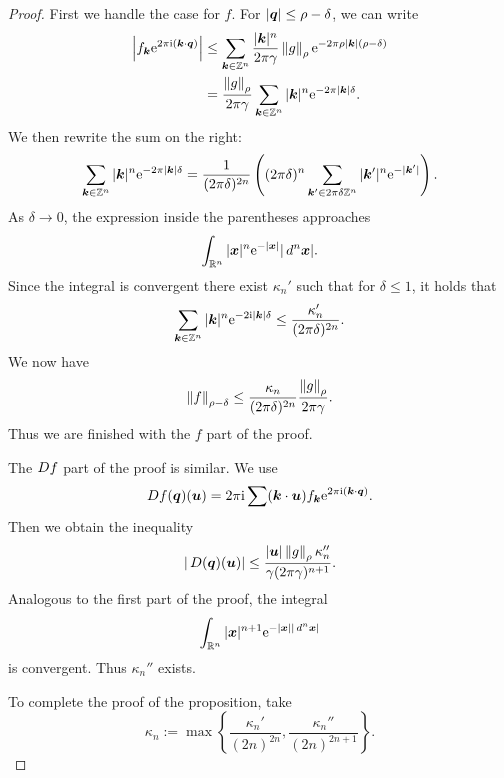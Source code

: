 \documentclass[twoside,letterpaper,11pt]{article}
\numberwithin{equation}{section}
\begin{document}
\begin{proof}
  First we handle the case for $f$.
  For $|\bm{q}| \leq \rho - \delta$, we can write
  \begin{align*}
    \left| f_{\bp{k}} \e^{2 \pi \i (\bp{k} \cdot \bp{q})} \right|
    &\leq \sum_{\bp{k} \in \Z^n} \frac{|\bp{k}|^n}{2\pi\gamma} \norm{g}_{\rho}
      \e^{-2 \pi \rho |\bp{k}|(\rho - \delta)}\\
    &= \frac{\norm{g}_{\rho}}{2 \pi \gamma} \sum_{\bp{k} \in \Z^n} |\bp{k}|^n
      \e^{-2 \pi |\bp{k}|\delta}.
  \end{align*}
  We then rewrite the sum on the right:
  \begin{equation*}
    \sum_{\bm{k} \in \mathbb{Z}^n} |\bm{k}|^n \mathrm{e}^{-2 \pi |\bm{k}|\delta} = \frac{1}{(2
      \pi \delta)^{2n}} \left((2 \pi \delta)^n \sum_{\bm{k}' \in 2 \pi \delta
        \mathbb{Z}^n} |\bm{k}'|^n \mathrm{e}^{-|\bm{k}'|} \right).
  \end{equation*}
  As $\delta \to 0$, the expression inside the parentheses approaches
  \begin{equation*}
    \int_{\mathbb{R}^n} |\bm{x}|^n \mathrm{e}^{-|\bm{x}|} |\mathop{}\!d^n \bm{x}|.
  \end{equation*}
  Since the integral is convergent there exist $\kappa_n'$ such that for $\delta
  \leq 1$, it holds that
  \begin{equation*}
    \sum_{\bm{k} \in \mathbb{Z}^n} |\bm{k}|^n \mathrm{e}^{-2 \mathrm{i} |\bm{k}|\delta} \leq
    \frac{\kappa_n'}{(2 \pi \delta)^{2n}}.
  \end{equation*}
  We now have
  \begin{equation*}
    \norm{f}_{\rho - \delta} \leq \frac{\kappa_n}{(2 \pi \delta)^{2n}}
    \frac{\norm{g}_{\rho}}{2 \pi \gamma}.
  \end{equation*}
  Thus we are finished with the $f$ part of the proof.

  The $\mathop{}\!D f$ part of the proof is similar.
  We use
  \begin{equation*}
    \mathop{}\!D f(\bm{q})(\bm{u}) = 2 \pi \mathrm{i} \sum(\bm{k} \cdot \bm{u}) f_{\bm{k}} \mathrm{e}^{2
      \pi \mathrm{i} (\bm{k} \cdot \bm{q})}.
  \end{equation*}
  Then we obtain the inequality
  \begin{equation*}
    |\Dif(\bp{q})(\bp{u})| \leq \frac{|\bp{u}| \norm{g}_{\rho}
      \kappa_n''}{\gamma(2 \pi \gamma)^{n+1}}.
  \end{equation*}
  Analogous to the first part of the proof, the integral
  \begin{equation*}
    \int_{\mathbb{R}^n} |\bm{x}|^{n+1} \mathrm{e}^{-|\bm{x}| |\mathop{}\!d^n\bm{x}|}
  \end{equation*}
  is convergent.
  Thus $\kappa_n''$ exists.

  To complete the proof of the proposition, take
  \begin{equation*}
    \kappa_n := \max \left\{\frac{\kappa_n'}{(2n)^{2n}},
      \frac{\kappa_n''}{(2n)^{2n+1}}\right\}.
  \end{equation*}
\end{proof}
\end{document}
